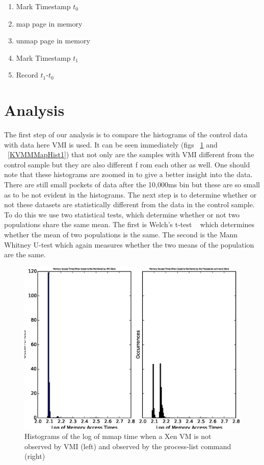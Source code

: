 \begin{enumerate}\label{MMapAlg}
	\item Mark Timestamp $t_0$
	\item map page in memory
	\item unmap page in memory
	\item Mark Timestamp $t_1$
	\item Record $t_1$-$t_0$
\end{enumerate}

\section{Analysis}

The first step of our analysis is to compare the histograms of the control data with data here VMI is used.  It can be seen immediately (figs ~\ref{XenMMapHist1} and ~\ref{KVMMMapHist1}) that not only are the samples with VMI different from the control sample but they are also different f
rom each other as well. One should note that these histograms are zoomed in to give a better insight into the data. There are still small pockets of data after the 10,000ms bin but these are so small as to be not evident in the histograms.  The next step is to determine whether or not these datasets are statistically different from the data in the control sample. To do this we use two statistical tests, which determine whether or not two populations share the same mean. The first is Welch's t-test ~\cite{welch_generalization_1947} which determines whether the mean of two populations is the same. The second is the Mann Whitney U-test which again measures whether the two means of the population are the same.


	\begin{figure}[p!]\label{XenMMapHist1}
	  \centering
	  \includegraphics[width=\textwidth]{figures/XenNoVMIVsProcList.eps}
	  \caption{Histograms of the log of mmap time when a Xen VM is not observed by VMI (left) and observed by the process-list command (right)}
	\end{figure}


